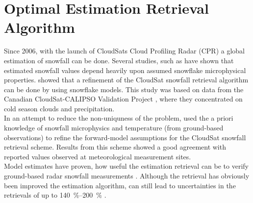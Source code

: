 \section{Optimal Estimation Retrieval Algorithm} %
\label{sec:retrieval}
Since 2006, with the launch of CloudSats Cloud Profiling Radar (CPR) a global estimation of snowfall can be done. Several studies, such as \cite{kulie_utilizing_2009} have shown that estimated snowfall values depend heavily upon assumed snowflake microphysical properties.
\cite{wood_microphysical_2015} showed that a refinement of the CloudSat snowfall retrieval algorithm can be done by using snowflake models. 
This study was based on data from the Canadian CloudSat-CALIPSO Validation Project \citep[C3VP,][]{hudak_canadian_2006}, where they concentrated on cold season clouds and precipitation.
\\
\noindent In an attempt to reduce the non-uniquness of the problem, \cite{wood_microphysical_2015} used the a priori knowledge of snowfall microphysics and temperature (from ground-based observations) to refine the forward-model assumptions for the CloudSat snowfall retrieval scheme. 
Results from this scheme showed a good agreement with reported values observed at meteorological measurement sites. \\
Model estimates have proven, how useful the estimation retrieval can be to verify ground-based radar snowfall measurements \citep{norin_intercomparison_2015}.
Although the retrieval has obviously been improved the estimation algorithm, can still lead to uncertainties in the retrievals of up to \SIrange{140}{200}{\percent} \citep{wood_estimation_2011}. 
\\
